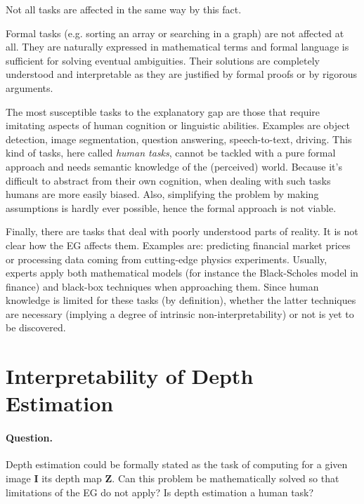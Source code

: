 \vspace{0.5cm}

Not all tasks are affected in the same way by this fact.

Formal tasks (e.g. sorting an array or searching in a graph) are not affected at all.
They are naturally expressed in mathematical terms and formal language is sufficient for solving eventual ambiguities.
Their solutions are completely understood and interpretable as they are justified by formal proofs or by rigorous arguments.

The most susceptible tasks to the explanatory gap are those that require imitating aspects of human cognition or linguistic abilities.
Examples are object detection, image segmentation, question answering, speech-to-text, driving.
This kind of tasks, here called \textit{human tasks}, cannot be tackled with a pure formal approach and needs semantic knowledge of the (perceived) world.
Because it's difficult to abstract from their own cognition, when dealing with such tasks humans are more easily biased.
Also, simplifying the problem by making assumptions is hardly ever possible, hence the formal approach is not viable.

Finally, there are tasks that deal with poorly understood parts of reality.
It is not clear how the EG affects them.
Examples are: predicting financial market prices or processing data coming from cutting-edge physics experiments.
Usually, experts apply both mathematical models (for instance the Black-Scholes model in finance) and black-box techniques when approaching them.
Since human knowledge is limited for these tasks (by definition), whether the latter techniques are necessary (implying a degree of intrinsic non-interpretability) or not is yet to be discovered.

\section{Interpretability of Depth Estimation}
\label{sec:interpretability of depth estimation}

\paragraph{Question.}
Depth estimation could be formally stated as the task of computing for a given image $\mathbf{I}$ its depth map $\mathbf{Z}$.
Can this problem be mathematically solved so that limitations of the EG do not apply?
Is depth estimation a human task?

